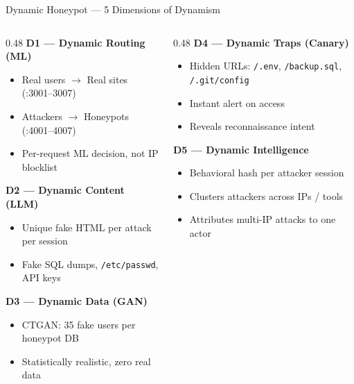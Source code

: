\documentclass[aspectratio=169,12pt]{beamer}
\begin{document}
\begin{frame}{Dynamic Honeypot --- 5 Dimensions of Dynamism}
  \begin{columns}[T]
    \begin{column}{0.48\textwidth}
      \textbf{\textcolor{dcCyan}{D1 --- Dynamic Routing (ML)}}
      \begin{itemize}\small
        \item Real users $\rightarrow$ Real sites (:3001--3007)
        \item Attackers $\rightarrow$ Honeypots (:4001--4007)
        \item Per-request ML decision, not IP blocklist
      \end{itemize}
      \vspace{0.25em}
      \textbf{\textcolor{dcGreen}{D2 --- Dynamic Content (LLM)}}
      \begin{itemize}\small
        \item Unique fake HTML per attack per session
        \item Fake SQL dumps, \texttt{/etc/passwd}, API keys
      \end{itemize}
      \vspace{0.25em}
      \textbf{\textcolor{dcYellow}{D3 --- Dynamic Data (GAN)}}
      \begin{itemize}\small
        \item CTGAN: 35 fake users per honeypot DB
        \item Statistically realistic, zero real data
      \end{itemize}
    \end{column}
    \begin{column}{0.48\textwidth}
      \textbf{\textcolor{dcPurple}{D4 --- Dynamic Traps (Canary)}}
      \begin{itemize}\small
        \item Hidden URLs: \texttt{/.env}, \texttt{/backup.sql}, \texttt{/.git/config}
        \item Instant alert on access
        \item Reveals reconnaissance intent
      \end{itemize}
      \vspace{0.25em}
      \textbf{\textcolor{dcRed}{D5 --- Dynamic Intelligence}}
      \begin{itemize}\small
        \item Behavioral hash per attacker session
        \item Clusters attackers across IPs / tools
        \item Attributes multi-IP attacks to one actor
      \end{itemize}
    \end{column}
  \end{columns}
\end{frame}
\end{document}
